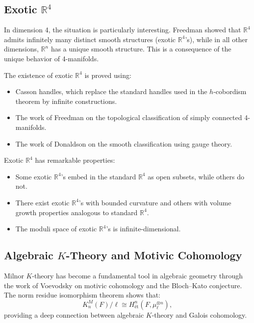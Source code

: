 \subsection{Exotic \texorpdfstring{$\mathbb{R}^4$}{R\^{}4}}

In dimension 4, the situation is particularly interesting. Freedman showed that $\mathbb{R}^4$ admits infinitely many distinct smooth structures (exotic $\mathbb{R}^4$'s), while in all other dimensions, $\mathbb{R}^n$ has a unique smooth structure. This is a consequence of the unique behavior of 4-manifolds.

The existence of exotic $\mathbb{R}^4$ is proved using:
\begin{itemize}
\item Casson handles, which replace the standard handles used in the $h$-cobordism theorem by infinite constructions.
\item The work of Freedman on the topological classification of simply connected 4-manifolds.
\item The work of Donaldson on the smooth classification using gauge theory.
\end{itemize}

Exotic $\mathbb{R}^4$ has remarkable properties:
\begin{itemize}
\item Some exotic $\mathbb{R}^4$'s embed in the standard $\mathbb{R}^4$ as open subsets, while others do not.
\item There exist exotic $\mathbb{R}^4$'s with bounded curvature and others with volume growth properties analogous to standard $\mathbb{R}^4$.
\item The moduli space of exotic $\mathbb{R}^4$'s is infinite-dimensional.
\end{itemize}

\subsection{Algebraic \texorpdfstring{$K$}{K}-Theory and Motivic Cohomology}

Milnor $K$-theory has become a fundamental tool in algebraic geometry through the work of Voevodsky on motivic cohomology and the Bloch--Kato conjecture. The norm residue isomorphism theorem shows that:
\[
K^M_n(F)/\ell \cong H^n_{\text{\'et}}(F, \mu_\ell^{\otimes n}),
\]
providing a deep connection between algebraic $K$-theory and Galois cohomology.

